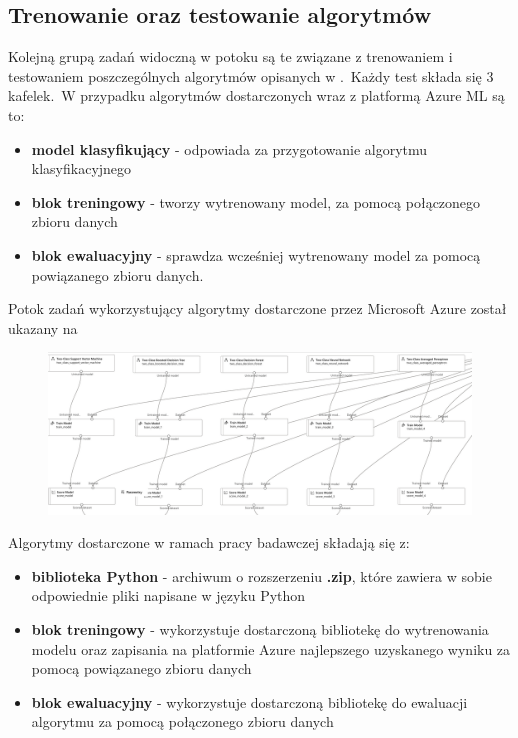 \subsection{Trenowanie oraz testowanie algorytmów}
Kolejną grupą zadań widoczną w potoku są te związane z trenowaniem i testowaniem poszczególnych algorytmów opisanych w .\ Każdy test składa się 3 kafelek.\ W przypadku algorytmów dostarczonych wraz z platformą Azure ML są to:
\begin{itemize}
    \item \textbf{model klasyfikujący} - odpowiada za przygotowanie algorytmu klasyfikacyjnego
    \item \textbf{blok treningowy} - tworzy wytrenowany model, za pomocą połączonego zbioru danych
    \item \textbf{blok ewaluacyjny} - sprawdza wcześniej wytrenowany model za pomocą powiązanego zbioru danych.
\end{itemize}
Potok zadań wykorzystujący algorytmy dostarczone przez Microsoft Azure został ukazany na 

\begin{figure}[H]
    \centering
    \includegraphics[width=\textwidth]{images/ms_pipe}
    \label{fig:ms-pipe}
\end{figure}

Algorytmy dostarczone w ramach pracy badawczej składają się z:
\begin{itemize}
    \item \textbf{biblioteka Python} - archiwum o rozszerzeniu \textbf{.zip}, które zawiera w sobie odpowiednie pliki napisane w języku Python
    \item \textbf{blok treningowy} - wykorzystuje dostarczoną bibliotekę do wytrenowania modelu oraz zapisania na platformie Azure najlepszego uzyskanego wyniku za pomocą powiązanego zbioru danych
    \item \textbf{blok ewaluacyjny} - wykorzystuje dostarczoną bibliotekę do ewaluacji algorytmu za pomocą połączonego zbioru danych
\end{itemize}

